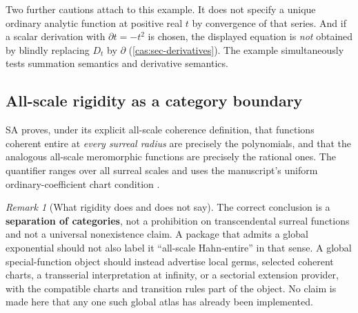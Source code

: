 \documentclass[11pt,letterpaper]{article}
\numberwithin{equation}{section}
\theoremstyle{definition}
\theoremstyle{remark}
\newtheorem{remark}[theorem]{Remark}
\begin{document}
Two further cautions attach to this example. It does not specify a unique
ordinary analytic function at positive real $t$ by convergence of that series.
And if a scalar derivation with $\partial t=-t^2$ is chosen, the displayed
equation is \emph{not} obtained by blindly replacing $D_t$ by $\partial$
(\cref{cas:sec-derivatives}). The example simultaneously tests summation
semantics and derivative semantics.

\subsection{All-scale rigidity as a category boundary}
\label{cas:sub-rigidity}
SA proves, under its explicit all-scale coherence definition, that functions
coherent entire at \emph{every surreal radius} are precisely the polynomials,
and that the analogous all-scale meromorphic functions are precisely the
rational ones. The quantifier ranges over all surreal scales and uses the
manuscript's uniform ordinary-coefficient chart condition
\cite{cas:SourceAnalysisTwo,cas:SourceAnalysisThree}.

\begin{remark}[What rigidity does and does not say]\label{cas:rem-rigidity}
The correct conclusion is a \textbf{separation of categories}, not a prohibition
on transcendental surreal functions and not a universal nonexistence claim. A
package that admits a global exponential should not also label it ``all-scale
Hahn-entire'' in that sense. A global special-function object should instead
advertise local germs, selected coherent charts, a transserial interpretation at
infinity, or a sectorial extension provider, with the compatible charts and
transition rules part of the object. No claim is made here that any one such
global atlas has already been implemented.
\end{remark}
\end{document}
